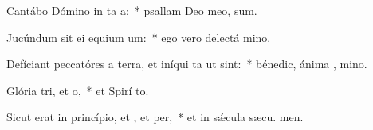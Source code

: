\item Cantábo Dómino in ta a:~* psallam Deo meo,  sum.
\item Jucúndum sit ei equium um:~* ego vero delectá  mino.
\item Defíciant peccatóres a terra, et iníqui ta ut  sint:~* bénedic, ánima , mino.
\item Glória tri, et o,~* et Spirí to.
\item Sicut erat in princípio, et , et per,~* et in sǽcula sæcu. men.
